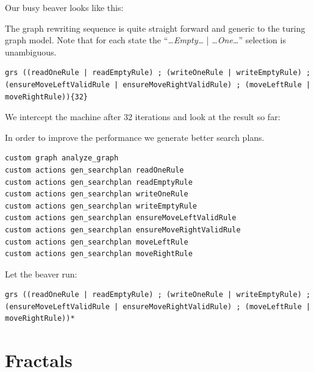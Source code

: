 Our busy beaver looks like this:
\begin{center}
\end{center}
The graph rewriting sequence is quite straight forward and generic to the turing graph model. Note that for each state the ``\emph{\dots Empty\dots} | \emph{\dots One\dots}'' selection is unambiguous.
\begin{lstlisting}[name=bb]
  grs ((readOneRule | readEmptyRule) ; (writeOneRule | writeEmptyRule) ; (ensureMoveLeftValidRule | ensureMoveRightValidRule) ; (moveLeftRule | moveRightRule)){32}
\end{lstlisting}
We intercept the machine after 32 iterations and look at the result so far:
\begin{center}
\end{center}
In order to improve the performance we generate better search plans.
\begin{lstlisting}[name=bb]
custom graph analyze_graph
custom actions gen_searchplan readOneRule
custom actions gen_searchplan readEmptyRule
custom actions gen_searchplan writeOneRule
custom actions gen_searchplan writeEmptyRule
custom actions gen_searchplan ensureMoveLeftValidRule
custom actions gen_searchplan ensureMoveRightValidRule
custom actions gen_searchplan moveLeftRule
custom actions gen_searchplan moveRightRule
\end{lstlisting}

Let the beaver run:
\begin{lstlisting}[name=bb]
  grs ((readOneRule | readEmptyRule) ; (writeOneRule | writeEmptyRule) ; (ensureMoveLeftValidRule | ensureMoveRightValidRule) ; (moveLeftRule | moveRightRule))*
\end{lstlisting}

\section{Fractals}
 